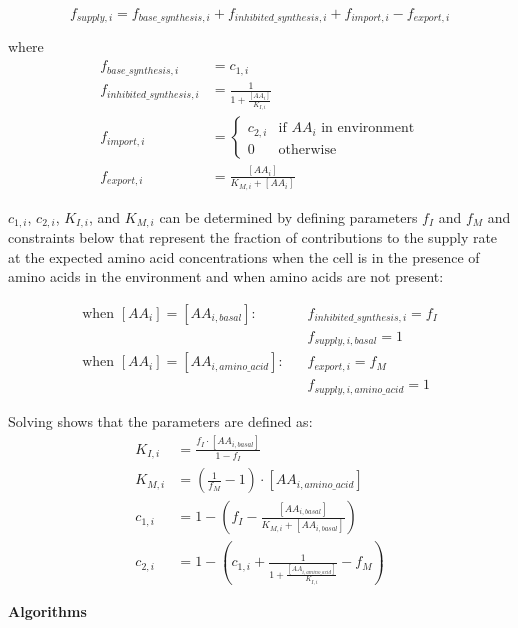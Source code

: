 \documentclass[12pt]{article}
\begin{document}
\[f_{supply,i} = f_{base\_synthesis,i} + f_{inhibited\_synthesis,i} + f_{import,i} - f_{export,i}\]

where
\begin{align*}
    f_{base\_synthesis,i} &= c_{1,i} \\
    f_{inhibited\_synthesis,i} &= \frac{1}{1 + \frac{[AA_i]}{K_{I,i}}} \\
    f_{import,i} &=
    \begin{cases}
        c_{2,i} & \text{if $AA_i$ in environment} \\
        0 & \text{otherwise}
    \end{cases} \\
    f_{export,i} &= \frac{[AA_i]}{K_{M,i} + [AA_i]}
\end{align*}

$c_{1,i}$, $c_{2,i}$, $K_{I,i}$, and $K_{M,i}$ can be determined by defining parameters $f_I$ and $f_M$ and constraints below that represent the fraction of contributions to the supply rate at the expected amino acid concentrations when the cell is in the presence of amino acids in the environment and when amino acids are not present:

\begin{align*}
    \text{when $[AA_i] = [AA_{i,basal}]$}: \hspace{10pt} & f_{inhibited\_synthesis,i} = f_I \\
    & f_{supply,i,basal} = 1 \\
    \text{when $[AA_i] = [AA_{i,amino\_acid}]$}:\hspace{10pt} & f_{export,i} = f_M \\
    & f_{supply,i,amino\_acid} = 1
\end{align*}

Solving shows that the parameters are defined as:
\begin{align*}
    K_{I,i} &= \frac{f_I\cdot [AA_{i,basal}]}{1 - f_I} \\
    K_{M,i} &= \left(\frac{1}{f_M} - 1\right)\cdot [AA_{i,amino\_acid}] \\
    c_{1,i} &= 1 - \left(f_I - \frac{[AA_{i,basal}]}{K_{M,i} + [AA_{i,basal}]}\right) \\
    c_{2,i} &= 1 - \left(c_{1,i} + \frac{1}{1 + \frac{[AA_{i,amino\_acid}]}{K_{I,i}}} - f_M\right)
\end{align*}

\pagebreak
\textbf{Algorithms}
\end{document}

